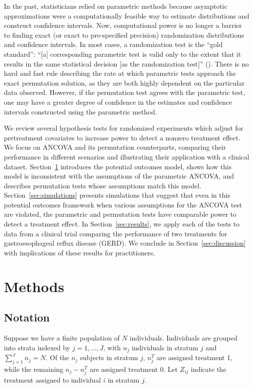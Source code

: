 \documentclass[12pt]{article}
\begin{document}
In the past, statisticians relied on parametric methods because asymptotic approximations were a computationally feasible way to estimate distributions and construct confidence intervals.
Now, computational power is no longer a barrier to finding exact (or exact to pre-specified precision) randomization distributions and confidence intervals.
In most cases, a randomization test is the ``gold standard'':
``[a] corresponding parametric test is valid only to the extent that it results in the same statistical decision [as the randomization test]'' (\cite{bradley_distribution_1968}).
There is no hard and fast rule describing the rate at which parametric tests approach the exact permutation solution, as they are both highly dependent on the particular data observed.
However, if the permutation test agrees with the parametric test, one may have a greater degree of confidence in the estimates and confidence intervals constructed using the parametric method.

We review several hypothesis tests for randomized experiments which adjust for pretreatment covariates to increase power to detect a nonzero treatment effect.  
We focus on ANCOVA and its permutation counterparts, comparing their performance in different scenarios and illustrating their application with a clinical dataset.
Section~\ref{sec:methods} introduces the potential outcomes model, shows how this model is inconsistent with the assumptions of the parametric ANCOVA, and describes permutation tests whose assumptions match this model.
Section~\ref{sec:simulations} presents simulations that suggest that even in this potential outcomes framework when various assumptions for the ANCOVA test are violated, the parametric and permutation tests have comparable power to detect a treatment effect.
In Section~\ref{sec:results}, we apply each of the tests to data from a clinical trial comparing the performance of two treatments for gastroesophageal reflux disease (GERD).
We conclude in Section~\ref{sec:discussion} with implications of these results for practitioners.

\section{Methods}\label{sec:methods}

\subsection{Notation}
Suppose we have a finite population of $N$ individuals.
Individuals are grouped into strata indexed by $j = 1, \dots, J$, with $n_j$ individuals in stratum $j$ and $\sum_{j=1}^J n_j = N$.
Of the $n_j$ subjects in stratum $j$, $n_j^T$ are assigned treatment 1, while the remaining $n_j - n_j^T$ are assigned treatment 0.
Let $Z_{ij}$ indicate the treatment assigned to individual $i$ in stratum $j$.
\end{document}
